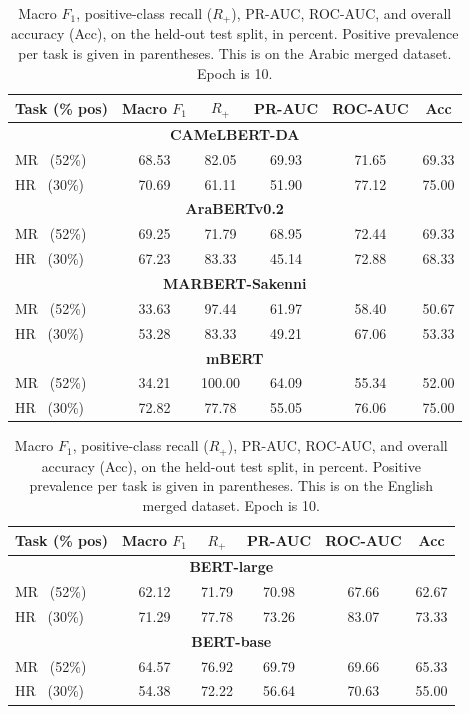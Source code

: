 \begin{table}[!htbp]
\centering
\caption{Macro $F_1$, positive-class recall ($R_{+}$), PR-AUC, ROC-AUC,
and overall accuracy (Acc), on the held-out test split, in percent. Positive prevalence
per task is given in parentheses. This is on the Arabic merged dataset. Epoch is 10.}
\label{tab:bert-results-merged-ar-ep10}
\setlength{\tabcolsep}{5pt}
\small
\begin{tabular}{l ccccc}
\toprule
Task (\% pos) & Macro $F_1$ & $R_{+}$ & PR-AUC & ROC-AUC & Acc \\
\midrule
\multicolumn{6}{c}{\textbf{CAMeLBERT-DA}} \\
\midrule
MR \ (52\%) & 68.53 & 82.05 & 69.93 & 71.65 & 69.33 \\
HR \ (30\%) & 70.69 & 61.11 & 51.90 & 77.12 & 75.00 \\
\midrule
\midrule
\multicolumn{6}{c}{\textbf{AraBERTv0.2}} \\
\midrule
MR \ (52\%) & 69.25 & 71.79 & 68.95 & 72.44 & 69.33 \\
HR \ (30\%) & 67.23 & 83.33 & 45.14 & 72.88 & 68.33 \\
\midrule
\midrule
\multicolumn{6}{c}{\textbf{MARBERT-Sakenni}} \\
\midrule
MR \ (52\%) & 33.63 & 97.44 & 61.97 & 58.40 & 50.67 \\
HR \ (30\%) & 53.28 & 83.33 & 49.21 & 67.06 & 53.33 \\
\midrule
\midrule
\multicolumn{6}{c}{\textbf{mBERT}} \\
\midrule
MR \ (52\%) & 34.21 & 100.00 & 64.09 & 55.34 & 52.00 \\
HR \ (30\%) & 72.82 & 77.78 & 55.05 & 76.06 & 75.00 \\
\bottomrule
\end{tabular}
\end{table}

\begin{table}[!htbp]
\centering
\caption{Macro $F_1$, positive-class recall ($R_{+}$), PR-AUC, ROC-AUC,
and overall accuracy (Acc), on the held-out test split, in percent. Positive prevalence
per task is given in parentheses. This is on the English merged dataset. Epoch is 10.}
\label{tab:bert-results-merged-en-ep10}
\setlength{\tabcolsep}{5pt}
\small
\begin{tabular}{l ccccc}
\toprule
Task (\% pos) & Macro $F_1$ & $R_{+}$ & PR-AUC & ROC-AUC & Acc \\
\midrule
\multicolumn{6}{c}{\textbf{BERT-large}} \\
\midrule
MR \ (52\%) & 62.12 & 71.79 & 70.98 & 67.66 & 62.67 \\
HR \ (30\%) & 71.29 & 77.78 & 73.26 & 83.07 & 73.33 \\
\midrule
\midrule
\multicolumn{6}{c}{\textbf{BERT-base}} \\
\midrule
MR \ (52\%) & 64.57 & 76.92 & 69.79 & 69.66 & 65.33 \\
HR \ (30\%) & 54.38 & 72.22 & 56.64 & 70.63 & 55.00 \\
\bottomrule
\end{tabular}
\end{table}
